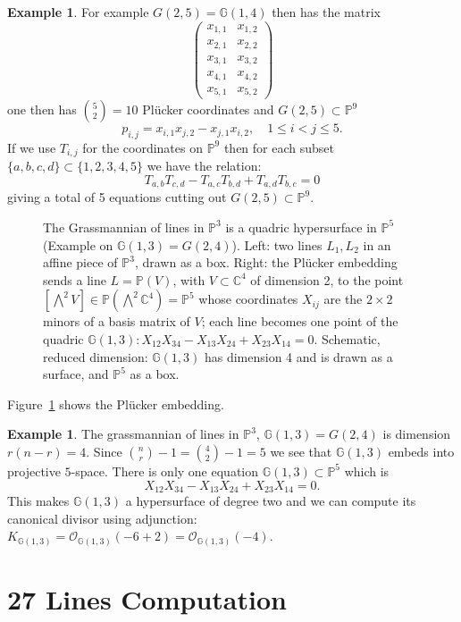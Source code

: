 \documentclass[12pt]{article}
\numberwithin{equation}{section}
\theoremstyle{definition}
\newtheorem{example}[theorem]{Example}
\theoremstyle{remark}
\newcommand{\CC}{\mathbb{C}}
\newcommand{\Ocal}{\mathcal{O}}
\newcommand{\PP}{\mathbb{P}}
\newcommand{\GG}{\mathbb{G}}
\begin{document}
\begin{example}
	For example $G(2,5)=\GG(1,4)$ then has the matrix
	$$ \begin{pmatrix}
	x_{1,1} & x_{1,2}  \\
	x_{2,1} & x_{2,2} \\
	x_{3,1} & x_{3,2} \\
	x_{4,1} & x_{4,2} \\
	x_{5,1} & x_{5,2}
	\end{pmatrix}
	$$ 
	one then has ${5 \choose 2} = 10$ Pl\"{u}cker coordinates and $G(2,5)\subset \PP^9$ 
	$$ p_{i,j}=x_{i,1}x_{j,2}-x_{j,1}x_{i,2}, \quad 1\leq i<j \leq 5.$$
	If we use $T_{i,j}$ for the coordinates on $\PP^9$ then for each subset $\lbrace a,b,c,d\rbrace \subset \lbrace 1,2,3,4,5\rbrace$ we have the relation:
	$$ T_{a,b}T_{c,d}-T_{a,c}T_{b,d} + T_{a,d}T_{b,c} =0$$
	giving a total of 5 equations cutting out $G(2,5)\subset \PP^9$.
\end{example}

\begin{figure}[H]
\centering

\caption{The Grassmannian of lines in $\PP^3$ is a quadric hypersurface in $\PP^5$ (Example on $\GG(1,3)=G(2,4)$). Left: two lines $L_1,L_2$ in an affine piece of $\PP^3$, drawn as a box. Right: the Pl\"ucker embedding sends a line $L=\PP(V)$, with $V\subset\CC^4$ of dimension 2, to the point $[\bigwedge^2V]\in\PP(\bigwedge^2\CC^4)=\PP^5$ whose coordinates $X_{ij}$ are the $2\times2$ minors of a basis matrix of $V$; each line becomes one point of the quadric $\GG(1,3)\colon X_{12}X_{34}-X_{13}X_{24}+X_{23}X_{14}=0$. Schematic, reduced dimension: $\GG(1,3)$ has dimension 4 and is drawn as a surface, and $\PP^5$ as a box.}\label{fig:plucker-quadric}
\end{figure}
Figure~\ref{fig:plucker-quadric} shows the Pl\"ucker embedding.

\begin{example}
	The grassmannian of lines in $\PP^3$, $\GG(1,3) = G(2,4)$ is dimension $r(n-r)=4$. 
	Since ${n \choose r } -1 = {4 \choose 2} -1 =5$ we see that $\GG(1,3)$ embeds into projective $5$-space. 
	There is only one equation $\GG(1,3)\subset \PP^5$ which is 
	$$ X_{12}X_{34}-X_{13}X_{24}+X_{23}X_{14}=0.$$
	This makes $\GG(1,3)$ a hypersurface of degree two and we can compute its canonical divisor using adjunction: $ K_{\GG(1,3)} = \Ocal_{\GG(1,3)}(-6+2) = \Ocal_{\GG(1,3)}(-4).$
\end{example}

\section{27 Lines Computation}
\end{document}
